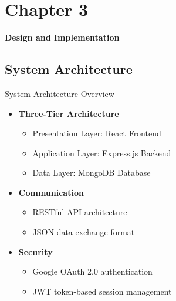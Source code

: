 
\section{Chapter 3}
\begin{frame}
\centering
\Huge \textbf{Design and Implementation}
\end{frame}

\subsection{System Architecture}

\begin{frame}{System Architecture Overview}
\begin{itemize}
    \item \textbf{Three-Tier Architecture}
    \begin{itemize}
        \item Presentation Layer: React Frontend
        \item Application Layer: Express.js Backend
        \item Data Layer: MongoDB Database
    \end{itemize}
    \vspace{0.5cm}
    \item \textbf{Communication}
    \begin{itemize}
        \item RESTful API architecture
        \item JSON data exchange format
    \end{itemize}
    \vspace{0.5cm}
    \item \textbf{Security}
    \begin{itemize}
        \item Google OAuth 2.0 authentication
        \item JWT token-based session management
    \end{itemize}
\end{itemize}
\end{frame}

